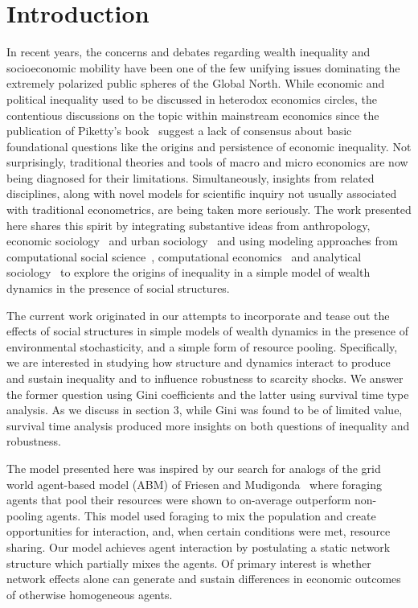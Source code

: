 \section{Introduction}
In recent years, the concerns and debates regarding wealth inequality and socioeconomic mobility have been one of the few unifying issues dominating the extremely polarized public spheres of the Global North. While economic and political inequality used to be discussed in heterodox economics circles, the contentious discussions on the topic within mainstream economics since the publication of Piketty's book~\cite{piketty2017capital} suggest a lack of consensus about basic foundational questions like the origins and persistence of economic inequality. Not surprisingly, traditional theories and tools of macro and micro economics are now being diagnosed for their limitations. Simultaneously, insights from related disciplines, along with novel models for scientific inquiry not usually associated with traditional econometrics, are being taken more seriously. The work presented here shares this spirit by integrating substantive ideas from anthropology, economic sociology~\cite{granovetter2017society} and urban sociology~\cite{sampson2012great} and using modeling approaches from computational social science~\cite{hedstrom2018}, computational economics~\cite{tesfatsion} and analytical sociology~\cite{hedstrom2011oxford} to explore the origins of inequality in a simple model of wealth dynamics in the presence of social structures.    

The current work originated in our attempts to incorporate and tease out the effects of social structures in simple models of wealth dynamics in the presence of environmental stochasticity, and a simple form of resource pooling. Specifically, we are interested in studying how structure and dynamics interact to produce and sustain inequality and to influence robustness to scarcity shocks. We answer the former question using Gini coefficients and the latter using survival time type analysis. As we discuss in section 3, while Gini was found to be of limited value, survival time analysis produced more insights on both questions of inequality and robustness. 

The model presented here was inspired by our search for analogs of the grid world agent-based model (ABM) of Friesen and Mudi\-gonda~\cite{srimil} where foraging agents that pool their resources were shown to on-average outperform non-pooling agents. This model used foraging to mix the population and create opportunities for interaction, and, when certain conditions were met, resource sharing. Our model achieves agent interaction by postulating a static network structure which partially mixes the agents. Of primary interest is whether network effects alone can generate and sustain differences in economic outcomes of otherwise homogeneous agents.  

